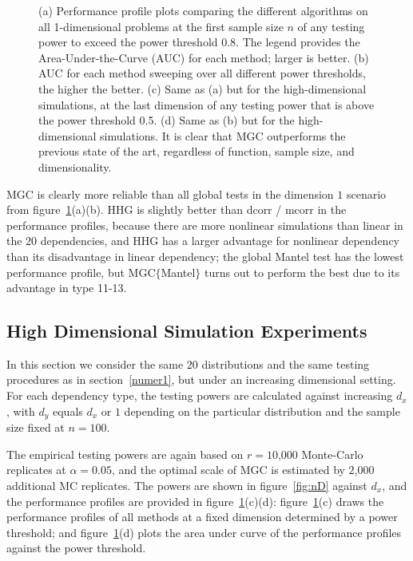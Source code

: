 \documentclass[11pt]{article}
\begin{document}
\begin{figure}[htbp]
{(a) Performance profile plots comparing the different algorithms on all 1-dimensional problems at the first sample size $n$ of any testing power to exceed the power threshold 0.8. The legend provides the Area-Under-the-Curve (AUC) for each method; larger is better.
(b) AUC for each method sweeping over all different power thresholds, the higher the better.
(c) Same as (a) but for the high-dimensional simulations, at the last dimension of any testing power that is above the power threshold 0.5.
(d) Same as (b) but for the high-dimensional simulations.
It is clear that MGC outperforms the previous state of the art, regardless of function, sample size, and dimensionality.}
\label{fig:pp}
\end{figure}

MGC is clearly more reliable than all global tests in the dimension $1$ scenario from figure~\ref{fig:pp}(a)(b). HHG is slightly better than dcorr / mcorr in the performance profiles, because there are more nonlinear simulations than linear in the $20$ dependencies, and HHG has a larger advantage for nonlinear dependency than its disadvantage in linear dependency; the global Mantel test has the lowest performance profile, but MGC$\{$Mantel$\}$ turns out to perform the best due to its advantage in type 11-13. 



\subsection{High Dimensional Simulation Experiments}
\label{numer2}
In this section we consider the same $20$ distributions and the same testing procedures as in section~\ref{numer1}, but under an increasing dimensional setting. For each dependency type, the testing powers are calculated against increasing $d_{x}$, with $d_{y}$ equals $d_{x}$ or $1$ depending on the particular distribution and the sample size fixed at $n=100$.

The empirical testing powers are again based on $r=10$,$000$ Monte-Carlo replicates at $\alpha=0.05$, and the optimal scale of MGC is estimated by $2$,$000$ additional MC replicates. The powers are shown in figure~\ref{fig:nD} against $d_{x}$, and the performance profiles are provided in figure~\ref{fig:pp}(c)(d): figure~\ref{fig:pp}(c) draws the performance profiles of all methods at a fixed dimension determined by a power threshold; and figure~\ref{fig:pp}(d) plots the area under curve of the performance profiles against the power threshold.
\end{document}

